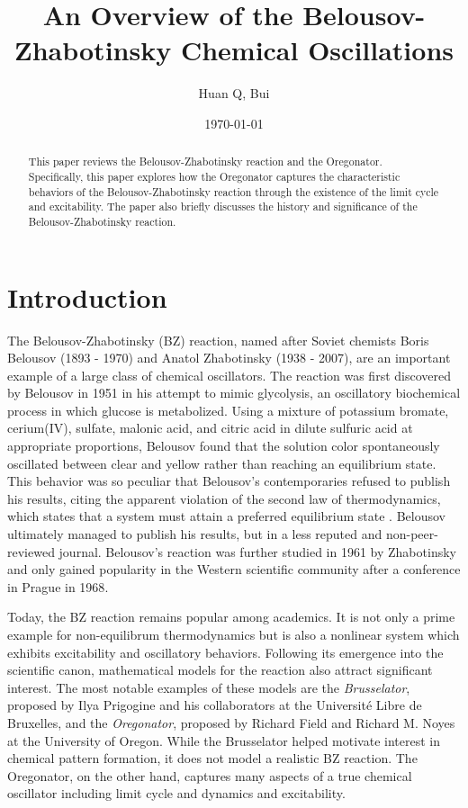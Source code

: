 \documentclass[twocolumn,amsmath,amssymb,aps]{revtex4}
\begin{document}
\title{An Overview of the Belousov-Zhabotinsky Chemical Oscillations}%
\author{Huan Q, Bui}
\date{\today}
\begin{abstract}
This paper reviews the Belousov-Zhabotinsky reaction and the Oregonator. Specifically, this paper explores how the Oregonator captures the characteristic behaviors of the Belousov-Zhabotinsky reaction through the existence of the limit cycle and excitability. The paper also briefly discusses the history and significance of the Belousov-Zhabotinsky reaction. 
\end{abstract}
\maketitle




\section{Introduction}
The Belousov-Zhabotinsky (BZ) reaction, named after Soviet chemists Boris Belousov (1893 - 1970) and Anatol Zhabotinsky (1938 - 2007), are an important example of a large class of chemical oscillators. The reaction was first discovered by Belousov in 1951 in his attempt to mimic glycolysis, an oscillatory biochemical process in which glucose is metabolized. Using a mixture of potassium bromate, cerium(IV), sulfate, malonic acid, and citric acid in dilute sulfuric acid at appropriate proportions, Belousov found that the solution color spontaneously oscillated between clear and yellow rather than reaching an equilibrium state. This behavior was so peculiar that Belousov's contemporaries refused to publish his results, citing the apparent violation of the second law of thermodynamics, which states that a system must attain a preferred equilibrium state \cite{ball1999self}. Belousov ultimately managed to publish his results, but in a less reputed and non-peer-reviewed journal. Belousov's reaction was further studied in 1961 by Zhabotinsky and only gained popularity in the Western scientific community after a conference in Prague in 1968\cite{doi:10.1021/ed061p661}.

Today, the BZ reaction remains popular among academics. It is not only a prime example for non-equilibrum thermodynamics but is also a nonlinear system which exhibits excitability and oscillatory behaviors. Following its emergence into the scientific canon, mathematical models for the reaction also attract significant interest. The most notable examples of these models are the \textit{Brusselator}, proposed by Ilya Prigogine and his collaborators at the Université Libre de Bruxelles, and the \textit{Oregonator}, proposed by Richard Field and Richard M. Noyes at the University of Oregon. While the Brusselator helped motivate interest in chemical pattern formation, it does not model a realistic BZ reaction. The Oregonator, on the other hand, captures many aspects of a true chemical oscillator including limit cycle and dynamics and excitability.
\end{document}

